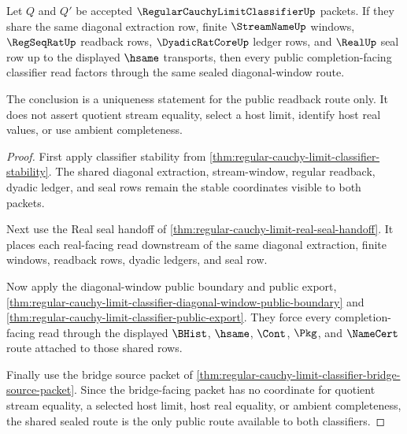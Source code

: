 \begin{theorem}
\label{thm:regular-cauchy-limit-classifier-diagonal-seal-uniqueness}
Let $Q$ and $Q'$ be accepted $\RegularCauchyLimitClassifierUp$ packets. If they share the same diagonal extraction row, finite $\StreamNameUp$ windows, $\RegSeqRatUp$ readback rows, $\DyadicRatCoreUp$ ledger rows, and $\RealUp$ seal row up to the displayed $\hsame$ transports, then every public completion-facing classifier read factors through the same sealed diagonal-window route.

The conclusion is a uniqueness statement for the public readback route only. It does not assert quotient stream equality, select a host limit, identify host real values, or use ambient completeness.
\end{theorem}
\begin{proof}
First apply classifier stability from \autoref{thm:regular-cauchy-limit-classifier-stability}. The shared diagonal extraction, stream-window, regular readback, dyadic ledger, and seal rows remain the stable coordinates visible to both packets.

Next use the Real seal handoff of \autoref{thm:regular-cauchy-limit-real-seal-handoff}. It places each real-facing read downstream of the same diagonal extraction, finite windows, readback rows, dyadic ledgers, and seal row.

Now apply the diagonal-window public boundary and public export, \autoref{thm:regular-cauchy-limit-classifier-diagonal-window-public-boundary} and \autoref{thm:regular-cauchy-limit-classifier-public-export}. They force every completion-facing read through the displayed $\BHist$, $\hsame$, $\Cont$, $\Pkg$, and $\NameCert$ route attached to those shared rows.

Finally use the bridge source packet of \autoref{thm:regular-cauchy-limit-classifier-bridge-source-packet}. Since the bridge-facing packet has no coordinate for quotient stream equality, a selected host limit, host real equality, or ambient completeness, the shared sealed route is the only public route available to both classifiers.
\end{proof}

